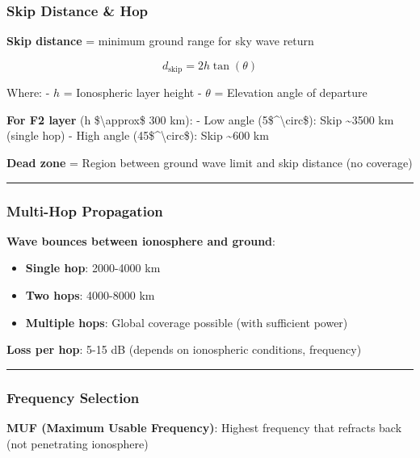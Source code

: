 \subsubsection{Skip Distance \& Hop}\label{skip-distance-hop}

\textbf{Skip distance} = minimum ground range for sky wave return

\[
d_{\text{skip}} = 2h \tan(\theta)
\]

Where: - \(h\) = Ionospheric layer height - \(\theta\) = Elevation angle
of departure

\textbf{For F2 layer} (h \$\textbackslash approx\$ 300 km): - Low angle
(5\$\^{}\textbackslash circ\$): Skip \textasciitilde3500 km (single hop)
- High angle (45\$\^{}\textbackslash circ\$): Skip \textasciitilde600 km

\textbf{Dead zone} = Region between ground wave limit and skip distance
(no coverage)

\begin{center}\rule{0.5\linewidth}{0.5pt}\end{center}

\subsubsection{Multi-Hop Propagation}\label{multi-hop-propagation}

\textbf{Wave bounces between ionosphere and ground}:

\begin{itemize}
\tightlist
\item
  \textbf{Single hop}: 2000-4000 km
\item
  \textbf{Two hops}: 4000-8000 km
\item
  \textbf{Multiple hops}: Global coverage possible (with sufficient
  power)
\end{itemize}

\textbf{Loss per hop}: 5-15 dB (depends on ionospheric conditions,
frequency)

\begin{center}\rule{0.5\linewidth}{0.5pt}\end{center}

\subsubsection{Frequency Selection}\label{frequency-selection}

\textbf{MUF (Maximum Usable Frequency)}: Highest frequency that refracts
back (not penetrating ionosphere)

